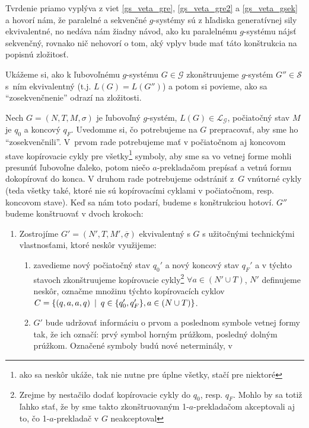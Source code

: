 \begin{dokaz}
Tvrdenie priamo vyplýva z viet \ref{gs_veta_gre}, \ref{gs_veta_gre2} a
\ref{gs_veta_gsek} a hovorí nám, že paralelné a sekvenčné $g$-systémy
sú z hľadiska generatívnej sily ekvivalentné, no nedáva nám žiadny
návod, ako ku paralelnému $g$-systému nájsť sekvenčný, rovnako nič
nehovorí o tom, aký vplyv bude mať táto konštrukcia na popisnú
zložitosť.

Ukážeme si, ako k ľubovoľnému $g$-systému $G\in\mathcal{G}$
zkonštruujeme $g$-systém $G''\in\mathcal{S}$ \mbox{s ním}
ekvivalentný (t.j. $L(G)=L(G'')$) a potom si povieme, ako sa
``zosekvenčnenie'' odrazí na zložitosti.

Nech $G=(N,T,M,\sigma)$ je ľubovoľný $g$-systém,
$L(G)\in\mathcal{L_G}$, počiatočný stav $M$ je $q_0$ a koncový
$q_F$. Uvedomme si, čo potrebujeme na $G$ prepracovať, aby sme ho
``zosekvenčnili''. \mbox{V prvom} rade potrebujeme mať v
po\-čia\-toč\-nom aj koncovom stave kopírovacie cykly pre
všetky\footnote{ako sa neskôr ukáže, tak nie nutne pre úplne
všetky, stačí pre niektoré} symboly, aby sme sa vo vetnej forme
mohli presunúť ľubovoľne ďaleko, potom niečo $a$-prek\-la\-da\-čom
prepísať a vetnú formu dokopírovať do konca. V druhom rade
potrebujeme odstrániť \mbox{z $G$} vnútorné cykly (teda všetky
také, ktoré nie sú kopírovacími cyklami v počiatočnom,
\mbox{resp.} koncovom stave). Keď sa nám toto podarí, budeme s
konštrukciou hotoví. $G''$ budeme konštruovať v dvoch krokoch:
\begin{enumerate}
  \item Zostrojíme $G'=(N',T,M',\underline{\overline{\sigma}})$
  ekvivalentný s $G$ s užitočnými technickými vlastnosťami, ktoré
  neskôr využijeme:
  \begin{enumerate}
    \item zavedieme nový počiatočný stav $q_0'$ a nový koncový stav
    $q_F'$ a v týchto stavoch zkonštruujeme kopírovacie
    cykly\footnote{Zrejme by nestačilo dodať kopírovacie cykly do
    $q_0$, resp. $q_F$. Mohlo by sa totiž ľahko stať, že by sme takto
    zkonštruovaným 1-$a$-prekladačom akceptovali aj to, čo
    1-$a$-prekladač v $G$ neakceptoval} $\forall a\in(N'\cup T)$, $N'$
    definujeme neskôr, označme množinu týchto kopírovacích cyklov
    $C=\{(q,a,a,q)\enspace |\enspace q\in\{q'_0,q'_F\},a\in(N\cup T)\}$.
    \item $G'$ bude udržovať informáciu o prvom  a poslednom symbole
    vetnej formy tak, že ich označí: prvý symbol horným prúžkom,
    posledný dolným prúžkom. Označené symboly budú nové neterminály, v

\end{enumerate}
\end{enumerate}
\end{dokaz}
